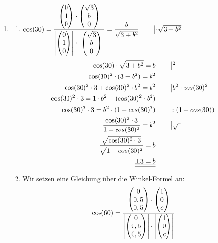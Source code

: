 \begin{enumerate}
		\bigskip
		\item 	
		\begin{enumerate}									
			\item	$\cos(30) =\dfrac{\begin{pmatrix} 0 \\ 1 \\ 0 \end{pmatrix} \cdot \begin{pmatrix} \sqrt{3} \\ b \\ 0 \end{pmatrix}} {\left|\begin{pmatrix} 0 \\ 1 \\ 0 \end{pmatrix}\right| \cdot \left|\begin{pmatrix} \sqrt{3} \\ b \\ 0 \end{pmatrix}\right|} = \dfrac{b}{\sqrt{3+b^2}}      \qquad \left|\cdot \sqrt{3+b^2}\right.$\\
			
			\begin{align*}
			\cos(30) \cdot \sqrt{3+b^2} = b &	\qquad\left|^2\right. \\			
			\cos(30)^2 \cdot (3+b^2) = b^2&\\			
			\cos(30)^2 \cdot 3 + \cos(30)^2 \cdot b^2 = b^2      &\qquad\left|\-b^2\cdot cos(30)^2\right.\\			
			\cos(30)^2 \cdot 3 = 1 \cdot b^2 - (\cos(30)^2 \cdot b^2)\\			
			\cos(30)^2 \cdot 3 = b^2 \cdot (1-cos(30)^2) &\qquad\left|:(1-cos(30))\right.\\		
			\dfrac{\cos(30)^2 \cdot 3}{1-cos(30)^2}=b^2 &\qquad\left|\sqrt{~}\right.\\			
			\dfrac{\sqrt{\cos(30)^2 \cdot 3}}{\sqrt{1-cos(30)^2}}=b\\			
			\underline{\underline{\pm3=b}}
			\end{align*}
                      \item

                        Wir setzen eine Gleichung über die Winkel-Formel an:
                        $$\cos(60)=
                        \frac{\begin{pmatrix} 0 \\ 0,5 \\ 0,5 \end{pmatrix} \cdot \begin{pmatrix} 1 \\ 0 \\ c \end{pmatrix}}
                        {\left|\begin{pmatrix} 0 \\ 0,5 \\ 0,5 \end{pmatrix}\right| \cdot
                          \left|\begin{pmatrix} 1 \\ 0 \\ c \end{pmatrix}\right|}$$


\end{enumerate}
\end{enumerate}
